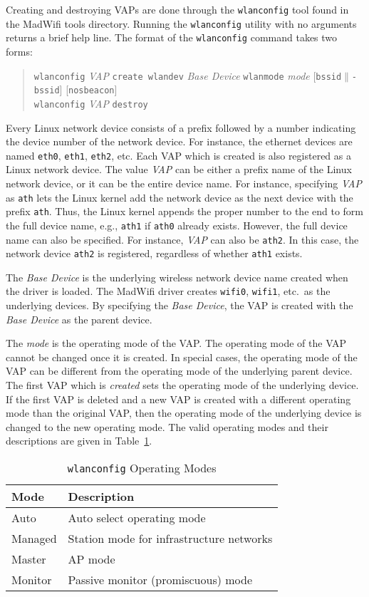 \documentclass[10pt,fullpage]{article}
\newcommand{\mytt}[1]{{\texttt{#1}}}
\newcommand{\bv}{\begin{verse}}
\newcommand{\ev}{\end{verse}}
\newcommand{\clival}[1]{{\emph{#1}}}
\begin{document}
Creating and destroying VAPs are done through the \mytt{wlanconfig}
tool found in the MadWifi tools directory.  Running the
\mytt{wlanconfig} utility with no arguments returns a brief help
line.  The format of the \mytt{wlanconfig} command takes two forms:
\bv
\mytt{wlanconfig} \clival{VAP} \mytt{create wlandev}
\clival{Base Device} \mytt{wlanmode} \clival{mode}
[\mytt{bssid}$\|$\mytt{-bssid}] [\mytt{nosbeacon}]\\
\mytt{wlanconfig} \clival{VAP} \mytt{destroy}
\ev
Every Linux network device consists of a prefix followed by a number
indicating the device number of the network device.  For instance, the
ethernet devices are named \mytt{eth0}, \mytt{eth1}, \mytt{eth2},
etc.  Each VAP which is created is also registered as a Linux network
device.  The value \clival{VAP} can be either a prefix name of the Linux
network device, or it can be the entire device name.  For instance,
specifying \clival{VAP} as \mytt{ath} lets the Linux kernel add the
network device as the next device with the prefix \mytt{ath}.  Thus,
the Linux kernel appends the proper number to the end to form the full
device name, e.g., \mytt{ath1} if \mytt{ath0} already exists.
However, the full device name can also be specified.  For instance,
\clival{VAP} can also be \mytt{ath2}.  In this case, the network
device \mytt{ath2} is registered, regardless of whether \mytt{ath1}
exists.

The \clival{Base Device} is the underlying wireless network device
name created when the driver is loaded.  The MadWifi driver creates
\mytt{wifi0}, \mytt{wifi1}, etc.\ as the underlying devices.  By
specifying the \clival{Base Device}, the VAP is created with the
\clival{Base Device} as the parent device.

The \clival{mode} is the operating mode of the VAP.  The operating
mode of the VAP cannot be changed once it is created.  In special
cases, the operating
mode of the VAP can be different from the operating mode of the
underlying parent device.  The first VAP which is \emph{created} sets
the operating mode of the underlying device.  If the first VAP is
deleted and a new VAP is created with a different operating mode than
the original VAP, then the operating mode of the underlying device is
changed to the new operating mode.  The valid operating modes and
their descriptions are given in Table~\ref{tab:wlanOpMode}.
\begin{table}[h*]
  \centering
  \begin{tabular}{|l|l|} \hline
    Mode & Description \\ \hline
    Auto &  Auto select operating mode \\
    Managed & Station mode for infrastructure networks\\
    Master & AP mode \\
    Monitor & Passive monitor (promiscuous) mode \\ \hline
  \end{tabular}
  \caption{\mytt{wlanconfig} Operating Modes}
  \label{tab:wlanOpMode}
\end{table}
\end{document}
